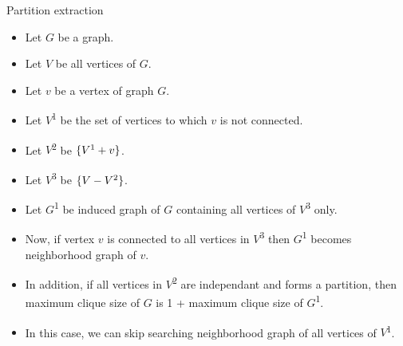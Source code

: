 \documentclass[landscape]{slides}
\begin{document}
\begin{slide}
	\begin{center}
		{\large Partition extraction }
	\end{center}

	\begin{itemize}
		\setlength{\itemsep}{0pt}
		\setlength{\parskip}{0pt}
		\setlength{\parsep}{0pt}
		\item Let {$G$} be a graph.
		\item Let {$V$} be all vertices of {$G$}.
		\item Let {$v$} be a vertex of graph {$G$}.
		\item Let {$V$}\textsuperscript{1} be the set of vertices to which {$v$} is not connected.
		\item Let {$V$}\textsuperscript{2} be {$\{ V\textsuperscript{1} + v \}$}.
		\item Let {$V$}\textsuperscript{3} be {$\{ V - V\textsuperscript{2}\}$}.
		\item Let {$G$}\textsuperscript{1} be induced graph of {$G$} containing all vertices of {$V$}\textsuperscript{3} only.
		\item Now, if vertex {$v$} is connected to all vertices in {$V$}\textsuperscript{3} then {$G$}\textsuperscript{1} becomes neighborhood graph of {$v$}.
		\item In addition, if all vertices in {$V$}\textsuperscript{2} are independant and forms a partition, then maximum clique size of {$G$} is 1 + maximum clique size of {$G$}\textsuperscript{1}.
		\item In this case, we can skip searching neighborhood graph of all vertices of {$V$}\textsuperscript{1}.
	\end{itemize}
\end{slide}



\begin{slide}
\end{slide}
\end{document}
